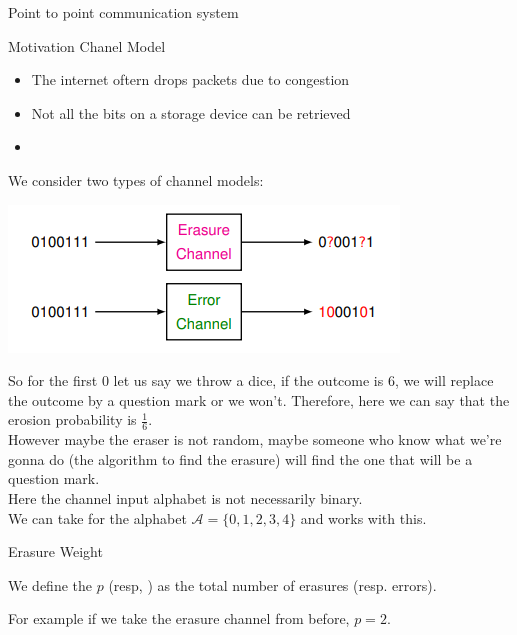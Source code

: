 

\begin{parag}{Point to point communication system}
    
\end{parag}


\begin{parag}{Motivation Chanel Model}
    \begin{itemize}
        \item The internet oftern drops packets due to congestion
        \item Not all the bits on a storage device can be retrieved
        \item {}
    \end{itemize}
    We consider two types of channel models:
    \begin{center}
        \includegraphics[scale=1]{12025-04-29.png}
    \end{center}
    So for the first $0$ let us say we throw a dice, if the outcome is $6$, we will replace the outcome by a question mark or we won't. Therefore, here we can say that the erosion probability is $\frac{1}{6}$.\\
    However maybe the eraser is not random, maybe someone who know what we're gonna do (the algorithm to find the erasure) will find the one that will be a question mark.
\\
Here the channel input alphabet is not necessarily binary.\\
We can take for the alphabet $\mathcal{A} = \{0, 1, 2, 3, 4\}$ and works with this.
\end{parag}
\begin{parag}{Erasure Weight}
    \begin{definition}
    We define the  $p$ (resp, ) as the total number of erasures (resp. errors).
    \end{definition}
    
    For example if we take the erasure channel from before, $p= 2$.
\end{parag}
